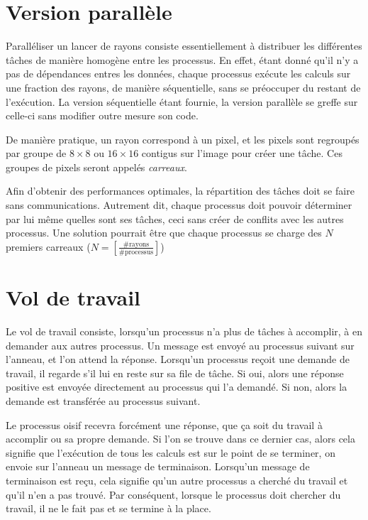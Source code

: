 \documentclass[a4paper,11pt]{article}
\begin{document}
\section{Version parallèle}

Paralléliser un lancer de rayons consiste essentiellement à distribuer les différentes tâches de manière homogène entre les processus. En effet, étant donné qu'il n'y  a pas de dépendances entres les données, chaque processus exécute les calculs sur une fraction des rayons, de manière séquentielle, sans se préoccuper du restant de l'exécution. La version séquentielle étant fournie, la version parallèle se greffe sur celle-ci sans modifier outre mesure son code.

De manière pratique, un rayon correspond à un pixel, et les pixels sont regroupés par groupe de $8 \times 8$ ou $16 \times 16$ contigus sur l'image pour créer une tâche. Ces groupes de pixels seront appelés \emph{carreaux}. 

Afin d'obtenir des performances optimales, la répartition des tâches doit se faire sans communications. Autrement dit, chaque processus doit pouvoir déterminer par lui même quelles sont ses tâches, ceci sans créer de conflits avec les autres processus. Une solution pourrait être que chaque processus se charge des $N$ premiers carreaux ($N = \left[\frac{\#\mathrm{rayons}}{\#\mathrm{processus}}\right]$)


\section{Vol de travail}

Le vol de travail consiste, lorsqu'un processus n'a plus de tâches à accomplir, à en demander aux autres processus. Un message est envoyé au processus suivant sur l'anneau, et l'on attend la réponse. Lorsqu'un processus reçoit une demande de travail, il regarde s'il lui en reste sur sa file de tâche. Si oui, alors une réponse positive est envoyée directement au processus qui l'a demandé. Si non, alors la demande est transférée au processus suivant.

Le processus oisif recevra forcément une réponse, que ça soit du travail à accomplir ou sa propre demande. Si l'on se trouve dans ce dernier cas, alors cela signifie que l'exécution de tous les calculs est sur le point de se terminer, on envoie sur l'anneau un message de terminaison. Lorsqu'un message de terminaison est reçu, cela signifie qu'un autre processus a cherché du travail et qu'il n'en a pas trouvé. Par conséquent, lorsque le processus doit chercher du travail, il ne le fait pas et se termine à la place.
\end{document}

